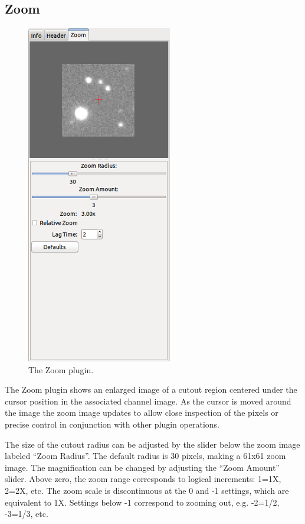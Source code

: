 \documentclass[11pt]{report}
\begin{document}
\subsection{Zoom}
\begin{figure}
  \includegraphics[width=2.5in]{zoom-plugin.png}
  \caption[example] 
          { \label{fig:zoom-plugin} 
            The Zoom plugin.} 
\end{figure} 
The Zoom plugin shows an enlarged image of a cutout region centered
under the cursor position in the associated channel image.  As the
cursor is moved around the image the zoom image updates to allow close
inspection of the pixels or precise control in conjunction with other
plugin operations.

The size of the cutout radius can be adjusted by the slider below the
zoom image labeled ``Zoom Radius''. The default radius is 30 pixels,
making a 61x61 zoom image.  The magnification can be changed by
adjusting the ``Zoom Amount'' slider.
Above zero, the zoom range corresponds to logical increments: 1=1X,
2=2X, etc.  The zoom scale is discontinuous at the 0 and -1 settings,
which are equivalent to 1X.  Settings below -1 correspond to zooming out,
e.g. -2=1/2, -3=1/3, etc. 
\end{document}
